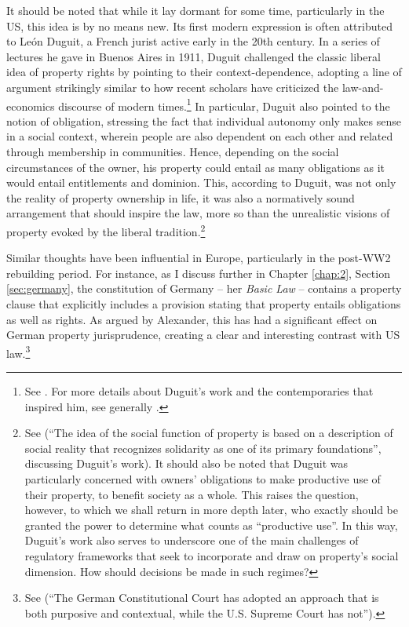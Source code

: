 \documentclass[12pt,a4paper]{book} %
\begin{document}
It should be noted that while it lay dormant for some time, particularly in the US, this idea is by no means new. Its first modern expression is often attributed to Le{\'o}n Duguit, a French jurist active early in the 20th century. In a series of lectures he gave in Buenos Aires in 1911, Duguit challenged the classic liberal idea of property rights by pointing to their context-dependence, adopting a line of argument strikingly similar to how recent scholars have criticized the law-and-economics discourse of modern times.\footnote{See \cite[1004-1008]{foster11}. For more details about Duguit's work and the contemporaries that inspired him, see generally \cite{mirow10}.} In particular, Duguit also pointed to the notion of obligation, stressing the fact that individual autonomy only makes sense in a social context, wherein people are also dependent on each other and related through membership in communities. Hence, depending on the social circumstances of the owner, his property could entail as many obligations as it would entail entitlements and dominion. This, according to Duguit, was not only the reality of property ownership in life, it was also a normatively sound arrangement that should inspire the law, more so than the unrealistic visions of property evoked by the liberal tradition.\footnote{See \cite[1005]{foster11} (``The idea of the social function of property is based on a description of social reality that recognizes solidarity as one of its primary foundations'', discussing Duguit's work). It should also be noted that Duguit was particularly concerned with owners' obligations to make productive use of their property, to benefit society as a whole. This raises the question, however, to which we shall return in more depth later, who exactly should be granted the power to determine what counts as ``productive use''. In this way, Duguit's work also serves to underscore one of the main challenges of regulatory frameworks that seek to incorporate and draw on property's social dimension. How should decisions be made in such regimes?} 

Similar thoughts have been influential in Europe, particularly in the post-WW2 rebuilding period. For instance, as I discuss further in Chapter \ref{chap:2}, Section \ref{sec:germany}, the constitution of Germany -- her {\it Basic Law} -- contains a property clause that explicitly includes a provision stating that property entails obligations as well as rights. As argued by Alexander, this has had a significant effect on German property jurisprudence, creating a clear and interesting contrast with US law.\footnote{See \cite[338]{alexander03} (``The German Constitutional Court has adopted an approach that is both purposive and contextual, while the U.S. Supreme Court has not'').} 
\end{document}
